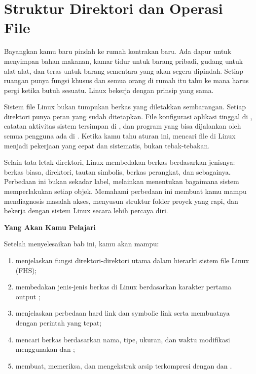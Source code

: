 
\chapter{Struktur Direktori dan Operasi File}
\label{ch:filesystem-ops}

Bayangkan kamu baru pindah ke rumah kontrakan baru. Ada dapur untuk menyimpan bahan makanan,
kamar tidur untuk barang pribadi, gudang untuk alat-alat, dan teras untuk barang sementara
yang akan segera dipindah. Setiap ruangan punya fungsi khusus dan semua orang di rumah itu
tahu ke mana harus pergi ketika butuh sesuatu. Linux bekerja dengan prinsip yang sama.

Sistem file Linux bukan tumpukan berkas yang diletakkan sembarangan. Setiap direktori punya
peran yang sudah ditetapkan. File konfigurasi aplikasi tinggal di , catatan
aktivitas sistem tersimpan di , dan program yang bisa dijalankan oleh semua
pengguna ada di . Ketika kamu tahu aturan ini, mencari file di Linux menjadi
pekerjaan yang cepat dan sistematis, bukan tebak-tebakan.

Selain tata letak direktori, Linux membedakan berkas berdasarkan jenisnya: berkas biasa,
direktori, tautan simbolis, berkas perangkat, dan sebagainya. Perbedaan ini bukan sekadar
label, melainkan menentukan bagaimana sistem memperlakukan setiap objek. Memahami perbedaan
ini membuat kamu mampu mendiagnosis masalah akses, menyusun struktur folder proyek yang
rapi, dan bekerja dengan sistem Linux secara lebih percaya diri.

\textbf{Yang Akan Kamu Pelajari}

Setelah menyelesaikan bab ini, kamu akan mampu:

\begin{enumerate}
    \item menjelaskan fungsi direktori-direktori utama dalam hierarki sistem file Linux (FHS);
    \item membedakan jenis-jenis berkas di Linux berdasarkan karakter pertama output ;
    \item menjelaskan perbedaan hard link dan symbolic link serta membuatnya dengan perintah yang tepat;
    \item mencari berkas berdasarkan nama, tipe, ukuran, dan waktu modifikasi menggunakan  dan ;
    \item membuat, memeriksa, dan mengekstrak arsip terkompresi dengan  dan .
\end{enumerate}

